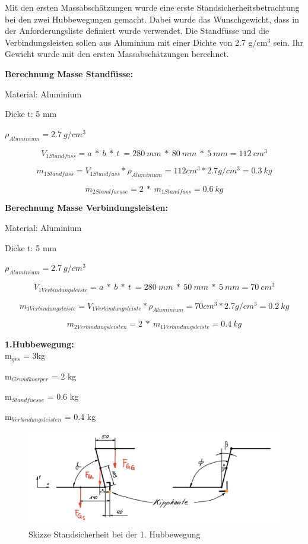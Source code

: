 Mit den ersten Massabschätzungen wurde eine erste Standsicherheitsbetrachtung bei den zwei Hubbewegungen gemacht. Dabei wurde das Wunschgewicht, dass in der Anforderungsliste definiert wurde verwendet. Die Standfüsse und die Verbindungsleisten sollen aus Aluminium mit einer Dichte\cite{Aluminium} von 2.7 g/cm$^{3}$ sein. Ihr Gewicht wurde mit den ersten Massabschätzungen berechnet.


\textbf{Berechnung Masse Standfüsse:}

Material: Aluminium

Dicke t: 5 mm

\(\rho_{Aluminium} = 2.7\ g/cm^3\)

\[V_{1 Standfuss} = a\ *\ b\ *\ t\ = 280\ mm\ *\ 80\ mm\ *\ 5\ mm = 112\ cm^3\]

\[m_{1 Standfuss} = V_{1 Standfuss} * \rho_{Aluminium} = 112 cm^3 * 2.7 g/cm^3 = 0.3\ kg\]

\[m_{2 Standfuesse} = 2\ *\ m_{1 Standfuss} = 0.6\ kg\]


\textbf{Berechnung Masse Verbindungsleisten:}

Material: Aluminium

Dicke t: 5 mm

\(\rho_{Aluminium} = 2.7\ g/cm^3\)

\[V_{1 Verbindungsleiste} = a\ *\ b\ *\ t\ = 280\ mm\ *\ 50\ mm\ *\ 5\ mm = 70\ cm^3\]

\[m_{1 Verbindungsleiste} = V_{1 Verbindungsleiste} * \rho_{Aluminium} = 70 cm^3 * 2.7 g/cm^3 = 0.2\ kg\]

\[m_{2 Verbindungsleisten} = 2\ *\ m_{1 Verbindungsleiste} = 0.4\ kg\]

\newpage

\textbf{1.Hubbewegung:}\\

m$_{ges}$ = 3kg

m$_{Grundkoerper}$ = 2 kg

m$_{Standfuesse}$ = 0.6 kg

m$_{Verbindungsleisten}$ = 0.4 kg\\

\begin{figure}[H]
  \includegraphics[width=1\textwidth]{img/Treppensteigen/Standsicherheit 1.Hub.png}
  \centering
  \caption{Skizze Standsicherheit bei der 1. Hubbewegung}
\end{figure}

